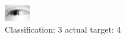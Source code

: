 \begin{figure}[h!]
\begin{center}
\includegraphics[width=0.60\columnwidth]{figures/ID2458_class_3_target_4.png}
\end{center}
\caption{ Classification: 3 actual target: 4}
\label{fig:ID2458_class_3_target_4}
\end{figure}
